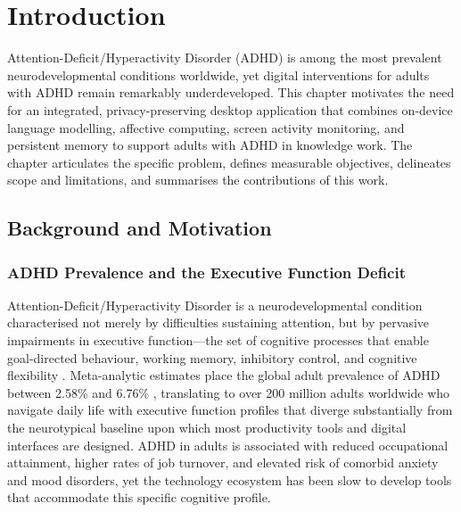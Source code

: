 \chapter{Introduction}
\label{ch:introduction}

Attention-Deficit/Hyperactivity Disorder (ADHD) is among the most prevalent neurodevelopmental conditions worldwide, yet digital interventions for adults with ADHD remain remarkably underdeveloped. This chapter motivates the need for an integrated, privacy-preserving desktop application that combines on-device language modelling, affective computing, screen activity monitoring, and persistent memory to support adults with ADHD in knowledge work. The chapter articulates the specific problem, defines measurable objectives, delineates scope and limitations, and summarises the contributions of this work.

\section{Background and Motivation}
\label{sec:background}

\subsection{ADHD Prevalence and the Executive Function Deficit}
\label{subsec:adhd-prevalence}

Attention-Deficit/Hyperactivity Disorder is a neurodevelopmental condition characterised not merely by difficulties sustaining attention, but by pervasive impairments in executive function---the set of cognitive processes that enable goal-directed behaviour, working memory, inhibitory control, and cognitive flexibility \cite{diamond2013}. Meta-analytic estimates place the global adult prevalence of ADHD between 2.58\% and 6.76\% \cite{faraone2021, song2021}, translating to over 200 million adults worldwide who navigate daily life with executive function profiles that diverge substantially from the neurotypical baseline upon which most productivity tools and digital interfaces are designed. ADHD in adults is associated with reduced occupational attainment, higher rates of job turnover, and elevated risk of comorbid anxiety and mood disorders, yet the technology ecosystem has been slow to develop tools that accommodate this specific cognitive profile.


